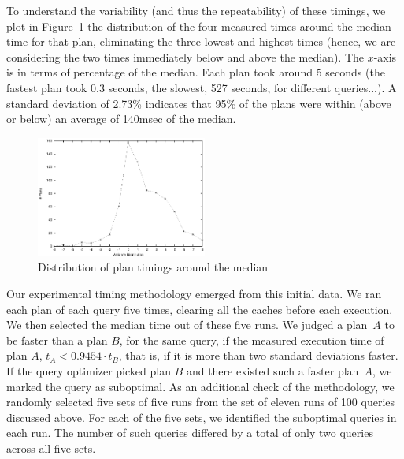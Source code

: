 To understand the variability (and thus the repeatability) of these timings,
we plot in Figure~\ref{fig:stddev} the distribution of the four measured
times around the median time for that plan, eliminating the three lowest and
highest times (hence, we are considering the two times immediately below and
above the median). The $x$-axis is in terms of percentage of the
median. Each plan took around 5 seconds (the fastest plan took 0.3 seconds,
the slowest, 527 seconds, for different queries...). A standard deviation of
2.73\% indicates that 95\% of the plans were within (above or below) an
average of 140msec of the median.

\begin{figure}[bth]\centering
\includegraphics[width=0.50\textwidth]{figures/variance_distribution.eps}
\caption{Distribution of plan timings around the median\label{fig:stddev}}
\end{figure}

Our experimental timing methodology emerged from this initial data. We ran each
plan of each query five times, clearing all the caches before each
execution. We then selected the median time out of these five runs. We
judged a plan~$A$ to be faster than a plan $B$, for the same query, if the
measured execution time of plan 
$A$, $t_A < 0.9454 \cdot t_B$, that is, if it is more than two standard deviations faster. If the query optimizer picked plan $B$ and
there existed such a faster plan~$A$, we marked the query as suboptimal. As an
additional check of the methodology, we randomly selected five sets of five
runs from the set of eleven runs of 100 queries discussed above. For each of
the five sets, we identified the suboptimal queries in each run. The number
of such queries differed by a total of only two queries across all five sets.


